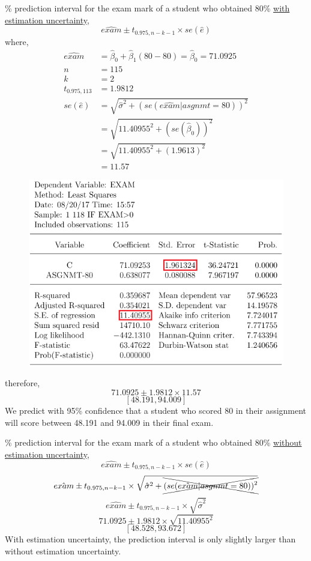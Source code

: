 \documentclass[12pt]{report}
\begin{document}
\newpage
{}\% prediction interval for the exam mark of a student who obtained 80\% \uline{with estimation uncertainty},
$$\widehat{exam} \pm t_{0.975,n-k-1} \times se(\hat{e})$$
\noindent where,
\begin{align*}
	\widehat{exam} &= \hat{\beta}_0 + \hat{\beta}_1(80-80) = \hat{\beta}_0 = 71.0925 \\
	n &= 115 \\
	k &= 2 \\
	t_{0.975,113 }&= 1.9812 \\
	se(\hat{e}) &= \sqrt{\hat{\sigma}^2 + (se(\hat{exam}|asgnmt=80))^2} \\
	&= \sqrt{11.40955^2 + (se(\hat{\beta}_0))^2} \\
	&= \sqrt{11.40955^2 + (1.9613)^2} \\
	&= 11.57
\end{align*}
\begin{figure}[H]
	\centering
	\includegraphics{q1_23}
\end{figure}
\vspace{-\baselineskip}
\noindent therefore,
$$71.0925 \pm 1.9812 \times 11.57$$
$$[48.191,94.009]$$
\noindent We predict with 95\% confidence that a student who scored 80 in their assignment will score between 48.191 and 94.009 in their final exam.

\newpage
{}\% prediction interval for the exam mark of a student who obtained 80\% \uline{without estimation uncertainty},
$$\hat{exam} \pm t_{0.975,n-k-1} \times se(\hat{e})$$
$$\hat{exam} \pm t_{0.975,n-k-1} \times \sqrt{\hat{\sigma}^2 + \xcancel{(se(\hat{exam}|asgnmt=80))^2}}$$
$$\hat{exam} \pm t_{0.975,n-k-1} \times \sqrt{\hat{\sigma}^2}$$
$$71.0925 \pm 1.9812 \times \sqrt{11.40955^2}$$
$$[48.528,93.672]$$
\noindent With estimation uncertainty, the prediction interval is only slightly larger than without estimation uncertainty.
\end{document}
